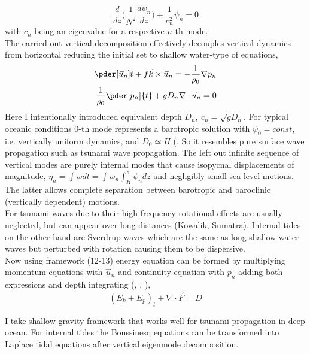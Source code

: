 \begin{equation}
\frac{d}{dz}\big( \frac{1}{N^2} \frac{d \psi_n}{dz} \big) + \frac{1}{c^2_n}\psi_n = 0
\end{equation}
with $c_n$ being an eigenvalue for a respective $n$-th mode.\\
The carried out vertical decomposition effectively decouples vertical dynamics from horizontal reducing the initial set to shallow water-type of equations,
\begin{align}
\pder[\vec{u}_n]{t} + f \vec{k} \times \vec{u}_n = -\frac{1}{\rho_0} \nabla p_n\\
\frac{1}{\rho_0} \pder[p_n]{t} + g D_n \nabla  \cdot \vec{u}_n = 0
\end{align}
Here I intentionally introduced equivalent depth $D_n,~c_n = \sqrt{g D_n}$. For typical oceanic conditions $0$-th mode represents a barotropic solution with $\psi_0 = const$, i.e.  vertically uniform dynamics, and $D_0 \simeq H$ (\cite{hendershott1981long}. So it resembles pure surface wave propagation such as tsunami wave propagation. The left out infinite sequence of vertical modes are purely internal modes that cause isopycnal displacements of magnitude, $\eta_n = \int w dt = \int w_n \int_H^z \psi_n dz$ and negligibly small sea level motions. The latter allows complete separation between barotropic and baroclinic (vertically dependent) motions.\\
For tsunami waves due to their high frequency rotational effects are usually neglected, but can appear over long distances (Kowalik, Sumatra). Internal tides on the other hand are Sverdrup waves which are the same as long shallow water waves but perturbed with rotation causing them to be dispersive.\\
Now using framework (12-13) energy equation can be formed by multiplying momentum equations with $\vec{u}_n$ and continuity equation with $p_n$ adding both expressions and depth integrating (\cite{nekrasov1990energy}, \cite{kowalik2013oceanography}, \cite{kelly2012cascade}),
\begin{equation}
(E_k + E_p)_t + \nabla \cdot \vec{F} = D
\end{equation}

I take shallow gravity framework that works well for tsunami propagation in deep ocean. For internal tides the Boussinesq equations can be transformed into Laplace tidal equations after vertical eigenmode decomposition.\\


